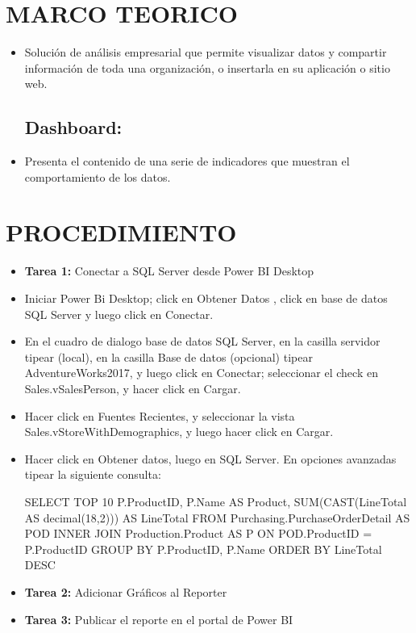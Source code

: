 \documentclass[12pt,letterpaper]{article}
\begin{document}
\section{MARCO TEORICO}
\begin{itemize}
\subsection{Power Bi:}
	\item Solución de análisis empresarial que permite visualizar datos y compartir información de toda una organización, o insertarla en su aplicación o sitio web. 
\subsection{Dashboard:}
	\item Presenta el contenido de una serie de indicadores que muestran el comportamiento de los datos. 
\end{itemize}
\section{PROCEDIMIENTO}
\begin{itemize}
	\item \textbf{Tarea 1:} Conectar a SQL Server desde Power BI Desktop 
	\item Iniciar Power Bi Desktop; click en Obtener Datos , click en base de datos SQL Server y luego click en Conectar.
	\item En el cuadro de dialogo base de datos SQL Server, en la casilla servidor tipear (local), en la casilla Base de
datos (opcional) tipear AdventureWorks2017, y luego click en Conectar; seleccionar el check en Sales.vSalesPerson, y hacer
click en Cargar. 
	\item Hacer click en Fuentes Recientes, y seleccionar la vista Sales.vStoreWithDemographics, y luego hacer click en Cargar.
	\item Hacer click en Obtener datos, luego en SQL Server. En opciones avanzadas tipear la siguiente consulta:
\par SELECT TOP 10 P.ProductID, P.Name AS Product, SUM(CAST(LineTotal AS decimal(18,2))) AS LineTotal FROM
Purchasing.PurchaseOrderDetail AS POD INNER JOIN Production.Product AS P ON POD.ProductID = P.ProductID
GROUP BY P.ProductID, P.Name ORDER BY LineTotal DESC 

	\item \textbf{Tarea 2:} Adicionar Gráficos al Reporter

	\item \textbf{Tarea 3:} Publicar el reporte en el portal de Power BI
\end{itemize}
\end{document}
